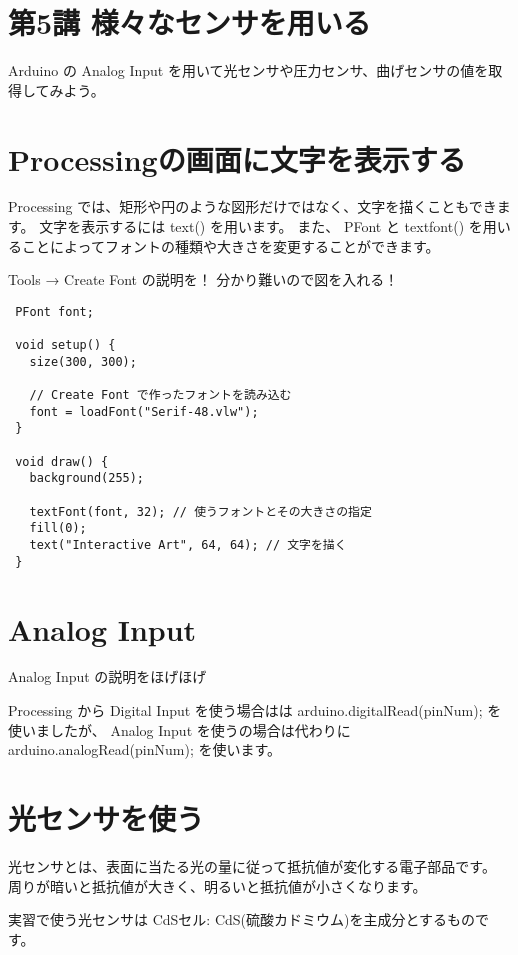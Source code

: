\documentclass[11pt,a4paper]{jarticle}
\begin{document}
\section*{\LARGE{第5講 様々なセンサを用いる}}
Arduino の Analog Input を用いて光センサや圧力センサ、曲げセンサの値を取得してみよう。


\section{Processingの画面に文字を表示する}
Processing では、矩形や円のような図形だけではなく、文字を描くこともできます。
文字を表示するには text() を用います。
また、 PFont と textfont() を用いることによってフォントの種類や大きさを変更することができます。

Tools → Create Font の説明を！
分かり難いので図を入れる！

\begin{lstlisting}
 PFont font;

 void setup() {
   size(300, 300);

   // Create Font で作ったフォントを読み込む
   font = loadFont("Serif-48.vlw");
 }

 void draw() {
   background(255);

   textFont(font, 32); // 使うフォントとその大きさの指定
   fill(0);
   text("Interactive Art", 64, 64); // 文字を描く
 }
\end{lstlisting}


\section{Analog Input}
Analog Input の説明をほげほげ

Processing から Digital Input を使う場合はは arduino.digitalRead(pinNum); を使いましたが、
Analog Input を使うの場合は代わりに arduino.analogRead(pinNum); を使います。


\section{光センサを使う}
光センサとは、表面に当たる光の量に従って抵抗値が変化する電子部品です。
周りが暗いと抵抗値が大きく、明るいと抵抗値が小さくなります。

実習で使う光センサは CdSセル: CdS(硫酸カドミウム)を主成分とするものです。
\end{document}
